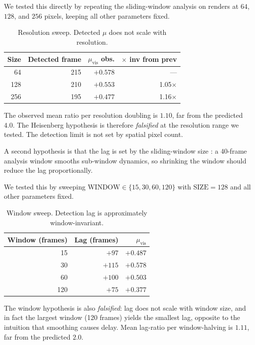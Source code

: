 \documentclass[11pt,a4paper]{article}
\begin{document}
We tested this directly by repeating the sliding-window analysis on
renders at $64$, $128$, and $256$ pixels, keeping all other
parameters fixed.

\begin{table}[h]
\centering
\caption{Resolution sweep. Detected $\mu$ does not scale with
resolution.}
\label{tab:resolution-sweep}
\begin{tabular}{rrrr}
\toprule
Size & Detected frame & $\mu_{\text{vis}}$ obs. & $\times$ inv from prev \\
\midrule
64 & 215 & $+0.578$ & --- \\
128 & 210 & $+0.553$ & 1.05$\times$ \\
256 & 195 & $+0.477$ & 1.16$\times$ \\
\bottomrule
\end{tabular}
\end{table}

The observed mean ratio per resolution doubling is $1.10$, far from the
predicted $4.0$. The Heisenberg hypothesis is therefore
\emph{falsified} at the resolution range we tested. The detection limit
is not set by spatial pixel count.

A second hypothesis is that the lag is set by the sliding-window
size : a $40$-frame analysis window smooths sub-window dynamics, so
shrinking the window should reduce the lag proportionally.

We tested this by sweeping $\text{WINDOW} \in \{15, 30, 60, 120\}$
with $\text{SIZE}=128$ and all other parameters fixed.

\begin{table}[h]
\centering
\caption{Window sweep. Detection lag is approximately
window-invariant.}
\label{tab:window-sweep}
\begin{tabular}{rrr}
\toprule
Window (frames) & Lag (frames) & $\mu_{\text{vis}}$ \\
\midrule
15 & $+97$ & $+0.487$ \\
30 & $+115$ & $+0.578$ \\
60 & $+100$ & $+0.503$ \\
120 & $+75$ & $+0.377$ \\
\bottomrule
\end{tabular}
\end{table}

The window hypothesis is also \emph{falsified}: lag does not scale
with window size, and in fact the largest window (120 frames) yields
the smallest lag, opposite to the intuition that smoothing causes
delay. Mean lag-ratio per window-halving is $1.11$, far from the
predicted $2.0$.
\end{document}
